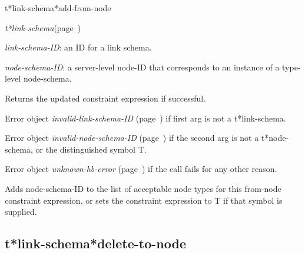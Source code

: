 \begin{description}
\item [Name:]  t*link-schema*add-from-node

\item [Class:] {\sl t*link-schema}\hfill(page~\pageref{t*link-schema})

\item [Parameters:]
\item {\sl link-schema-ID}:  an ID for a link schema.

\item {\sl node-schema-ID}:  a server-level node-ID that corresponds to an 
instance of a type-level node-schema. 



\item [Return-value:]
Returns the updated constraint expression if successful.

Error object {\sl invalid-link-schema-ID} (page~\pageref{invalid-link-schema-ID}) if first
arg is not a t*link-schema.

Error object {\sl invalid-node-schema-ID} (page~\pageref{invalid-node-schema-ID}) if the 
second arg is not a t*node-schema, or the distinguished
symbol T.

Error object {\sl unknown-hb-error} (page~\pageref{unknown-hb-error}) if the call fails
for any other reason. 

\item [Description:]

Adds node-schema-ID to the list of acceptable node
types for this from-node constraint expression, or 
sets the constraint expression to T if that symbol
is supplied.

\item [Public:]



\end{description}
\horizontalline

\subsection{t*link-schema*delete-to-node}
\label{t*link-schema*delete-to-node}

